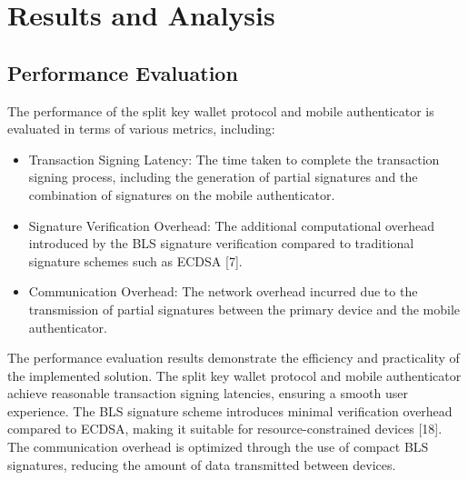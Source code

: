 \chapter{Results and Analysis}

\section{Performance Evaluation}
The performance of the split key wallet protocol and mobile authenticator is evaluated in terms of various metrics, including:
\begin{itemize}
    \item Transaction Signing Latency: The time taken to complete the transaction signing process, including the generation of partial signatures and the combination of signatures on the mobile authenticator.
    \item Signature Verification Overhead: The additional computational overhead introduced by the BLS signature verification compared to traditional signature schemes such as ECDSA [7].
    \item Communication Overhead: The network overhead incurred due to the transmission of partial signatures between the primary device and the mobile authenticator.
\end{itemize}

The performance evaluation results demonstrate the efficiency and practicality of the implemented solution. The split key wallet protocol and mobile authenticator achieve reasonable transaction signing latencies, ensuring a smooth user experience. The BLS signature scheme introduces minimal verification overhead compared to ECDSA, making it suitable for resource-constrained devices [18]. The communication overhead is optimized through the use of compact BLS signatures, reducing the amount of data transmitted between devices.

